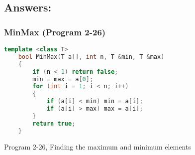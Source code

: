 \documentclass{article}
\begin{document}
\subsection{Answers:}
\subsubsection{MinMax (Program 2-26)}
\begin{lstlisting}[language=C++]
    template <class T>
    bool MinMax(T a[], int n, T &min, T &max)
    {
        if (n < 1) return false;
        min = max = a[0];
        for (int i = 1; i < n; i++)
        {
            if (a[i] < min) min = a[i];
            if (a[i] > max) max = a[i];
        }
        return true;
    }
\end{lstlisting}
\begin{center}
    Program 2-26, Finding the maximum and minimum elements
\end{center}
\end{document}
